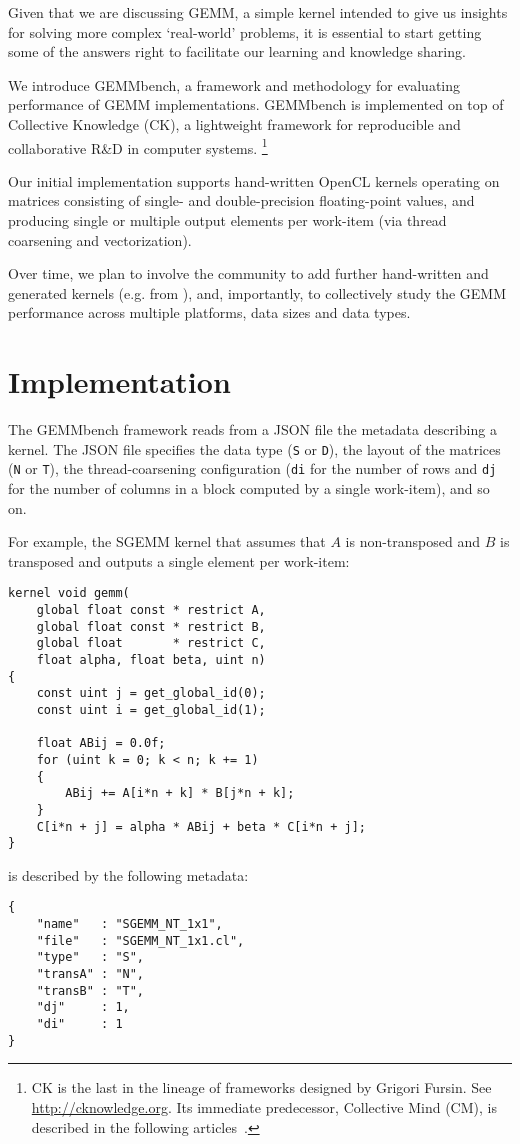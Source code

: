 \documentclass{acm_proc_article-sp} %
\begin{document}
Given that we are discussing GEMM, a simple kernel intended to
give us insights for solving more complex `real-world' problems, it is
essential to start getting some of the answers right to facilitate our learning
and knowledge sharing.

We introduce GEMMbench, a framework and methodology for evaluating performance
of GEMM implementations.
%
GEMMbench is implemented on top of Collective Knowledge (CK), a lightweight
framework for reproducible and collaborative R\&D in computer systems.%
\footnote{CK is the last in the lineage of frameworks designed by Grigori
Fursin. See \url{http://cknowledge.org}. Its immediate predecessor, Collective
Mind (CM), is described in the following articles~\cite{CollectiveMind,
CollectiveMind2}.}

Our initial implementation supports hand-written OpenCL kernels operating on
matrices consisting of single- and double-precision floating-point values, and
producing single or multiple output elements per work-item (via thread
coarsening and vectorization).

Over time, we plan to involve the community to add further hand-written and
generated kernels (e.g. from \cite{Beaugnon:2014,Steuwer:2015}), and,
importantly, to collectively study the GEMM performance across multiple
platforms, data sizes and data types.


\section{Implementation}
\label{sec:implementation}

%
The GEMMbench framework reads from a JSON file the metadata describing a
kernel.
%
The JSON file specifies the data type ({\tt S} or {\tt D}), the layout of the
matrices ({\tt N} or {\tt T}), the thread-coarsening configuration ({\tt di}
for the number of rows and {\tt dj} for the number of columns in a block
computed by a single work-item), and so on.

For example, the SGEMM kernel that assumes that $A$ is non-transposed and $B$
is transposed and outputs a single element per work-item:
%
\begin{verbatim}
kernel void gemm(
    global float const * restrict A,
    global float const * restrict B,
    global float       * restrict C,
    float alpha, float beta, uint n)
{
    const uint j = get_global_id(0);
    const uint i = get_global_id(1);

    float ABij = 0.0f;
    for (uint k = 0; k < n; k += 1)
    {
        ABij += A[i*n + k] * B[j*n + k];
    }
    C[i*n + j] = alpha * ABij + beta * C[i*n + j];
}
\end{verbatim}
%
is described by the following metadata:
%
\begin{verbatim}
{
    "name"   : "SGEMM_NT_1x1",
    "file"   : "SGEMM_NT_1x1.cl",
    "type"   : "S",
    "transA" : "N",
    "transB" : "T",
    "dj"     : 1,
    "di"     : 1
}
\end{verbatim}
\end{document}
